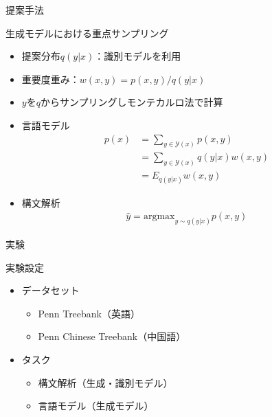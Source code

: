 \documentclass[aspectratio=43,unicode,10pt]{beamer}
\begin{document}
\begin{frame}{提案手法}
  \begin{block}{生成モデルにおける重点サンプリング}
    \begin{itemize}
      \item 提案分布$q(y|x)$：識別モデルを利用
      \item 重要度重み：$w(x, y) = p(x, y) / q(y | x)$
      \item $y$を$q$からサンプリングしモンテカルロ法で計算
      \item 言語モデル
        \begin{align*}
          p(x)
          & = \sum_{y \in \mathcal{Y}(x)} p(x, y) \\
          & = \sum_{y \in \mathcal{Y}(x)} q(y|x) w(x, y) \\
          & = E_{q(y|x)} w(x, y)
        \end{align*}
      \item 構文解析
        \begin{gather*}
          \hat{y} = \text{argmax}_{y \sim q(y|x)} p(x, y)
        \end{gather*}
    \end{itemize}
  \end{block}
\end{frame}

\begin{frame}{実験}
  \begin{block}{実験設定}
    \begin{itemize}
      \item データセット
        \begin{itemize}
          \item Penn Treebank（英語）
          \item Penn Chinese Treebank（中国語）
        \end{itemize}
      \item タスク
        \begin{itemize}
          \item 構文解析（生成・識別モデル）
          \item 言語モデル（生成モデル）
        \end{itemize}
    \end{itemize}
  \end{block}
\end{frame}
\end{document}
